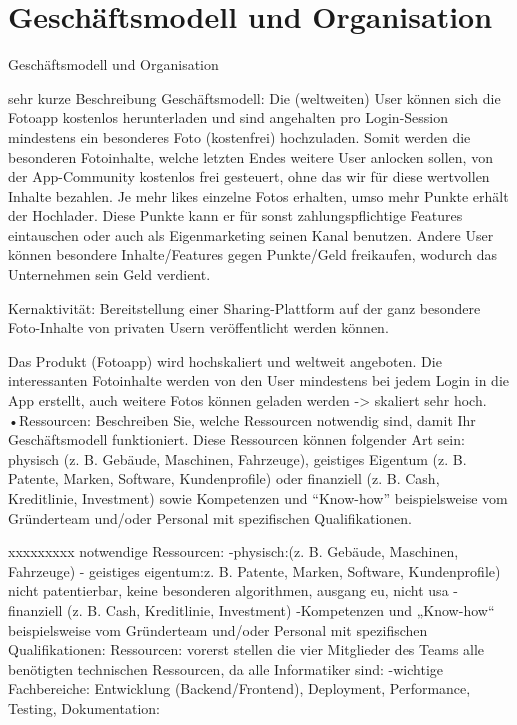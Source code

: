 \chapter{Geschäftsmodell und Organisation}


Geschäftsmodell und Organisation

sehr kurze Beschreibung Geschäftsmodell:
Die (weltweiten) User können sich die Fotoapp kostenlos herunterladen und sind angehalten pro Login-Session mindestens ein
besonderes Foto (kostenfrei) hochzuladen. Somit werden die besonderen Fotoinhalte, welche letzten Endes weitere User anlocken sollen, von der App-Community kostenlos frei gesteuert,
ohne das wir für diese wertvollen Inhalte bezahlen. Je mehr likes einzelne Fotos erhalten, umso mehr Punkte erhält der Hochlader.
Diese Punkte kann er für sonst zahlungspflichtige Features eintauschen oder auch als Eigenmarketing seinen Kanal benutzen. Andere User können besondere Inhalte/Features gegen Punkte/Geld freikaufen,
wodurch das Unternehmen sein Geld verdient.

Kernaktivität: Bereitstellung einer Sharing-Plattform auf der ganz besondere Foto-Inhalte von privaten Usern veröffentlicht werden können.


Das Produkt (Fotoapp) wird hochskaliert und weltweit angeboten. Die interessanten Fotoinhalte werden von den User mindestens bei jedem
Login in die App erstellt, auch weitere Fotos können geladen werden -> skaliert sehr hoch. 
•Ressourcen: Beschreiben Sie, welche Ressourcen notwendig sind, damit Ihr Geschäftsmodell funktioniert. 
Diese Ressourcen können folgender Art sein: physisch (z. B. Gebäude, Maschinen, Fahrzeuge), geistiges Eigentum
 (z. B. Patente, Marken, Software, Kundenprofile) oder finanziell (z. B. Cash, Kreditlinie, Investment) sowie 
 Kompetenzen und ``Know-how'' beispielsweise vom Gründerteam und/oder Personal mit spezifischen Qualifikationen.
 
 xxxxxxxxx
 notwendige Ressourcen:
 -physisch:(z. B. Gebäude, Maschinen, Fahrzeuge)
 - geistiges eigentum:z. B. Patente, Marken, Software, Kundenprofile)
  nicht patentierbar, keine besonderen algorithmen, ausgang eu, nicht usa
 -finanziell (z. B. Cash, Kreditlinie, Investment)
 -Kompetenzen und „Know-how“ beispielsweise vom Gründerteam und/oder Personal mit spezifischen Qualifikationen:
 Ressourcen: 
 vorerst stellen die vier Mitglieder des Teams alle benötigten technischen Ressourcen, da alle Informatiker sind:
 -wichtige Fachbereiche: Entwicklung (Backend/Frontend), Deployment, Performance, Testing, Dokumentation:
 
